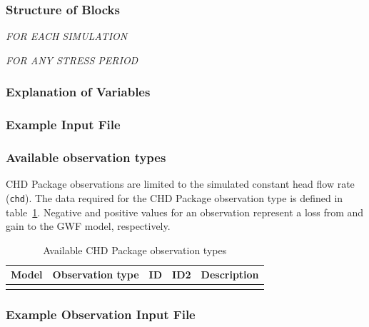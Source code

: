 \vspace{5mm}
\subsubsection{Structure of Blocks}
\vspace{5mm}

\noindent \textit{FOR EACH SIMULATION}


\vspace{5mm}
\noindent \textit{FOR ANY STRESS PERIOD}

\packageperioddescription

\vspace{5mm}
\subsubsection{Explanation of Variables}
\begin{description}

\end{description}

\vspace{5mm}
\subsubsection{Example Input File}


\vspace{5mm}
\subsubsection{Available observation types}
CHD Package observations are limited to the simulated constant head flow rate (\texttt{chd}). The data required for the CHD Package observation type is defined in table~\ref{table:gwf-chdobstype}. Negative and positive values for an observation represent a loss from and gain to the GWF model, respectively.

\begin{longtable}{p{2cm} p{2.75cm} p{2cm} p{1.25cm} p{7cm}}
\caption{Available CHD Package observation types} \tabularnewline

\hline
\hline
\textbf{Model} & \textbf{Observation type} & \textbf{ID} & \textbf{ID2} & \textbf{Description} \\
\hline
\endhead

\hline
\endfoot


\label{table:gwf-chdobstype}
\end{longtable}

\vspace{5mm}
\subsubsection{Example Observation Input File}


